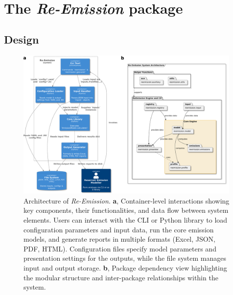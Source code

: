 \documentclass[final,1p,times]{elsarticle}
\begin{document}

\section{The \emph{Re-Emission} package}
\label{sec:reemission}

\subsection{Design}
\label{subsec:design}

\begin{figure}[ht]
    \centering
    \includegraphics[width=0.99\textwidth]{figures/high_level_achitecture.pdf}
	\caption{Architecture of \textit{Re-Emission}. \textbf{a}, Container-level interactions showing key components, their functionalities, and data flow between system elements. Users can interact with the \acf{CLI} or Python library to load configuration parameters and input data, run the core emission models, and generate reports in multiple formats (Excel, JSON, PDF, HTML). Configuration files specify model parameters and presentation settings for the outputs, while the file system manages input and output storage. \textbf{b}, Package dependency view highlighting the modular structure and inter-package relationships within the system.}
    \label{fig:high_level_archtecture}
\end{figure}
\end{document}
